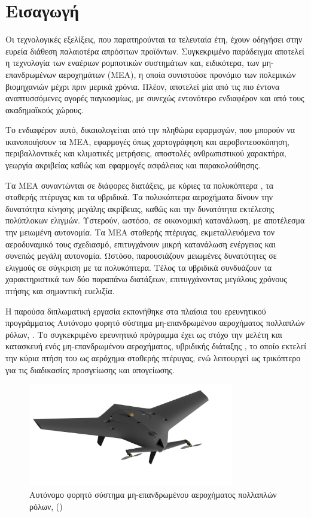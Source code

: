 \chapter{Εισαγωγή}

\noindent Οι τεχνολογικές εξελίξεις, που παρατηρούνται τα τελευταία έτη, έχουν 
οδηγήσει στην ευρεία διάθεση παλαιοτέρα απρόσιτων προϊόντων. Συγκεκριμένο 
παράδειγμα αποτελεί η τεχνολογία των εναέριων ρομποτικών συστημάτων και, 
ειδικότερα, των μη-επανδρωμένων αεροχημάτων (ΜΕΑ), η οποία συνιστούσε προνόμιο 
των πολεμικών βιομηχανιών μέχρι πριν μερικά χρόνια. Πλέον, αποτελεί μία από τις
πιο έντονα αναπτυσσόμενες αγορές παγκοσμίως, με συνεχώς εντονότερο ενδιαφέρον 
και από τους ακαδημαϊκούς χώρους. 

Το ενδιαφέρον αυτό, δικαιολογείται από την πληθώρα εφαρμογών, που μπορούν να 
ικανοποιήσουν τα ΜΕΑ, εφαρμογές όπως χαρτογράφηση και αεροβιντεοσκόπηση, 
περιβαλλοντικές και κλιματικές μετρήσεις, αποστολές ανθρωπιστικού χαρακτήρα,
γεωργία ακριβείας καθώς και εφαρμογές ασφάλειας και παρακολούθησης.

Τα ΜΕΑ συναντώνται σε διάφορες διατάξεις, με κύριες τα πολυκόπτερα 
, τα σταθερής πτέρυγας  και τα υβριδικά. Τα 
πολυκόπτερα αεροχήματα δίνουν την δυνατότητα κίνησης μεγάλης ακρίβειας, καθώς 
και την δυνατότητα εκτέλεσης πολύπλοκων ελιγμών. Υστερούν, ωστόσο, σε οικονομική 
κατανάλωση, με αποτέλεσμα την μειωμένη αυτονομία. Τα ΜΕΑ σταθερής πτέρυγας, 
εκμεταλλευόμενα τον αεροδυναμικό τους σχεδιασμό, επιτυγχάνουν μικρή κατανάλωση 
ενέργειας και συνεπώς μεγάλη αυτονομία. Ωστόσο, παρουσιάζουν μειωμένες 
δυνατότητες σε ελιγμούς σε σύγκριση με τα πολυκόπτερα. Τέλος τα υβριδικά 
συνδυάζουν τα χαρακτηριστικά των δύο παραπάνω διατάξεων, επιτυγχάνοντας 
μεγάλους χρόνους πτήσης και σημαντική ευελιξία.

Η παρούσα διπλωματική εργασία εκπονήθηκε στα πλαίσια του ερευνητικού 
προγράμματος Αυτόνομο φορητό σύστημα μη-επανδρωμένου αεροχήματος πολλαπλών 
ρόλων, . Το συγκεκριμένο ερευνητικό 
πρόγραμμα έχει ως στόχο την μελέτη και κατασκευή ενός μη-επανδρωμένου 
αεροχήματος, υβριδικής διάταξης  , 
το οποίο εκτελεί την κύρια πτήση του ως αερόχημα σταθερής πτέρυγας, ενώ 
λειτουργεί ως τρικόπτερο για τις διαδικασίες προσγείωσης και απογείωσης.

\begin{figure}[H]
    \centering
    \includegraphics[width=0.8\textwidth]{Skoupa/RX-4_Assembly_Positioning_v6.png}
    \caption{Αυτόνομο φορητό σύστημα μη-επανδρωμένου αεροχήματος πολλαπλών 
    ρόλων, ()}
\end{figure}

